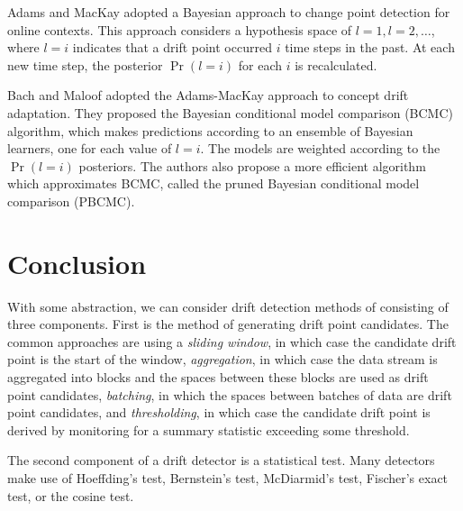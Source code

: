 Adams and MacKay \cite{adams_mackay} adopted a Bayesian approach to change point detection for online contexts. This approach considers a hypothesis space of $l=1, l=2, \dots$, where $l=i$ indicates that a drift point occurred $i$ time steps in the past. At each new time step, the posterior $\Pr(l=i)$ for each $i$ is recalculated.

Bach and Maloof \cite{BCMC} adopted the Adams-MacKay approach to concept drift adaptation. They proposed the Bayesian conditional model comparison (BCMC) algorithm, which makes predictions according to an ensemble of Bayesian learners, one for each value of $l=i$. The models are weighted according to the $\Pr(l=i)$ posteriors. The authors also propose a more efficient algorithm which approximates BCMC, called the pruned Bayesian conditional model comparison (PBCMC).







\section{Conclusion} \label{background:conclusion}

With some abstraction, we can consider drift detection methods of consisting of three components. First is the method of generating drift point candidates. The common approaches are using a {\it sliding window}, in which case the candidate drift point is the start of the window, {\it aggregation}, in which case the data stream is aggregated into blocks and the spaces between these blocks are used as drift point candidates, {\it batching}, in which the spaces between batches of data are drift point candidates, and {\it thresholding}, in which case the candidate drift point is derived by monitoring for a summary statistic exceeding some threshold.

The second component of a drift detector is a statistical test. Many detectors make use of Hoeffding's test, Bernstein's test, McDiarmid's test, Fischer's exact test, or the cosine test. 

